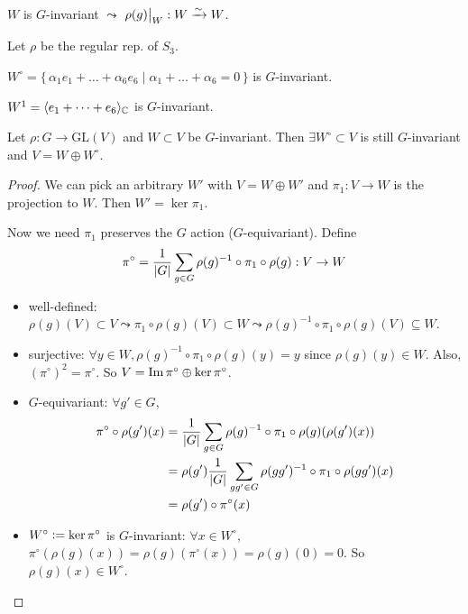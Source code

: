 $W$ is $G$-invariant $\leadsto$ $\rho(g) \big|_W: W \xrightarrow{\sim} W$.

\begin{example}
  Let $\rho$ be the regular rep. of $S_3$.

  $W^\circ = \{\, \alpha_1e_1 + \dots + \alpha_6e_6 \mid \alpha_1 +\dots + \alpha_6 = 0 \,\}$
  is $G$-invariant.

  $W^1 = \langle e_1 + \dots + e_6\rangle_{\mathbb{C}}$ is $G$-invariant.
\end{example}

\begin{theorem}
  Let $\rho: G \to \text{GL}(V)$ and $W \subset V$ be $G$-invariant.
  Then $\exists W^\circ \subset V$ is still $G$-invariant and
  $V = W \oplus W^\circ$.
  \begin{proof}
    We can pick an arbitrary $W'$ with $V = W \oplus W'$ and
    $\pi_1: V \to W$ is the projection to $W$. Then $W' = \ker \pi_1$.
    
    Now we need $\pi_1$ preserves the $G$ action ($G$-equivariant).
    Define
    \[
      \pi^\circ = \frac{1}{\lvert G\rvert} \sum_{g\in G}
      \rho(g)^{-1} \circ \pi_1 \circ \rho(g) : V \to W
    \]
    \begin{itemize}
      \item well-defined: $\rho(g)(V) \subset V \leadsto
        \pi_1 \circ \rho(g)(V) \subset W \leadsto
        \rho(g)^{-1} \circ \pi_1 \circ \rho(g)(V) \subseteq W$.
      \item surjective: $\forall y \in W,
        \rho(g)^{-1}\circ \pi_1 \circ\rho(g)(y) = y$ since
        $\rho(g)(y) \in W$. Also, $(\pi^\circ)^2 = \pi^\circ$.
        So $V = \operatorname{Im} \pi^\circ \oplus \ker \pi^\circ$.
      \item $G$-equivariant: $\forall g' \in G$,
        \begin{align*}
          \pi^\circ \circ \rho(g')(x)
          &= \frac{1}{\lvert G\rvert} \sum_{g\in G}
            \rho(g)^{-1}\circ\pi_1\circ\rho(g) (\rho(g')(x)) \\
          &= \rho(g') \frac{1}{\lvert G\rvert} \sum_{gg'\in G}
            \rho(gg')^{-1}\circ\pi_1\circ\rho(gg')(x) \\
          &= \rho(g') \circ \pi^\circ(x)
        \end{align*}
      \item $W^\circ \vcentcolon= \ker \pi^\circ$ is $G$-invariant:
        $\forall x \in W^\circ$, $\pi^\circ(\rho(g)(x))
        = \rho(g)(\pi^\circ(x)) = \rho(g)(0) = 0$. So
        $\rho(g)(x) \in W^\circ$.
    \end{itemize}
  \end{proof}
\end{theorem}

